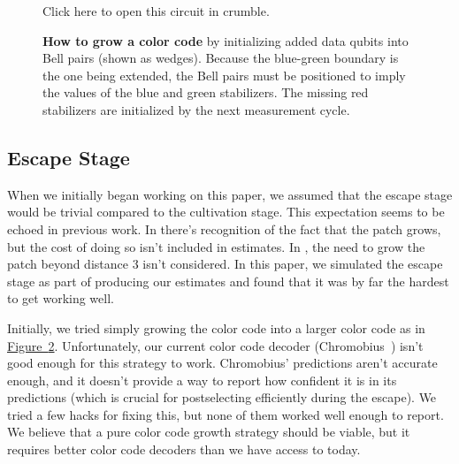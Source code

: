 \documentclass[onecolumn,unpublished,a4paper]{quantumarticle}
\theoremstyle{definition}
\newcommand{\fig}[1]{\hyperref[fig:#1]{Figure~\ref*{fig:#1}}}
\begin{document}
\begin{figure}[p]
{{        }{Click here to open this circuit in crumble.}
    }
    \label{fig:cat-check-d5}
\end{figure}

\begin{figure}
    \centering
    \caption{
        \textbf{How to grow a color code} by initializing added data qubits into Bell pairs (shown as wedges).
        Because the blue-green boundary is the one being extended, the Bell pairs must be positioned to imply the values of the blue and green stabilizers.
        The missing red stabilizers are initialized by the next measurement cycle.
    }
    \label{fig:color-code-growth}
\end{figure}



\subsection{Escape Stage}

When we initially began working on this paper, we assumed that the escape stage would be trivial compared to the cultivation stage.
This expectation seems to be echoed in previous work.
In \cite{chamberland2020colorinjection} there's recognition of the fact that the patch grows, but the cost of doing so isn't included in estimates.
In \cite{itogawa2024zeroleveldistilldistill}, the need to grow the patch beyond distance 3 isn't considered.
In this paper, we simulated the escape stage as part of producing our estimates and found that it was by far the hardest to get working well.

Initially, we tried simply growing the color code into a larger color code as in \fig{color-code-growth}.
Unfortunately, our current color code decoder (Chromobius~\cite{gidney2023colorcode}) isn't good enough for this strategy to work.
Chromobius' predictions aren't accurate enough, and it doesn't provide a way to report how confident it is in its predictions (which is crucial for postselecting efficiently during the escape).
We tried a few hacks for fixing this, but none of them worked well enough to report.
We believe that a pure color code growth strategy should be viable, but it requires better color code decoders than we have access to today.
\end{document}
